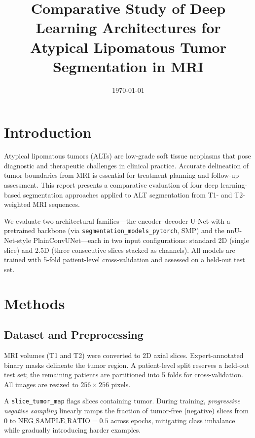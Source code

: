 \documentclass[11pt,a4paper]{article}
\title{Comparative Study of Deep Learning Architectures for\\ Atypical Lipomatous Tumor Segmentation in MRI}
\author{}
\date{\today}
\begin{document}
\maketitle

\section{Introduction}

Atypical lipomatous tumors (ALTs) are low-grade soft tissue neoplasms that pose diagnostic and therapeutic challenges in clinical practice. Accurate delineation of tumor boundaries from MRI is essential for treatment planning and follow-up assessment. This report presents a comparative evaluation of four deep learning-based segmentation approaches applied to ALT segmentation from T1- and T2-weighted MRI sequences.

We evaluate two architectural families---the encoder--decoder U-Net with a pretrained backbone (via \texttt{segmentation\_models\_pytorch}, SMP) and the nnU-Net-style PlainConvUNet---each in two input configurations: standard 2D (single slice) and 2.5D (three consecutive slices stacked as channels). All models are trained with 5-fold patient-level cross-validation and assessed on a held-out test set.

\section{Methods}

\subsection{Dataset and Preprocessing}

MRI volumes (T1 and T2) were converted to 2D axial slices. Expert-annotated binary masks delineate the tumor region. A patient-level split reserves a held-out test set; the remaining patients are partitioned into 5 folds for cross-validation. All images are resized to $256 \times 256$ pixels.

A \texttt{slice\_tumor\_map} flags slices containing tumor. During training, \emph{progressive negative sampling} linearly ramps the fraction of tumor-free (negative) slices from 0 to $\text{NEG\_SAMPLE\_RATIO} = 0.5$ across epochs, mitigating class imbalance while gradually introducing harder examples.
\end{document}
